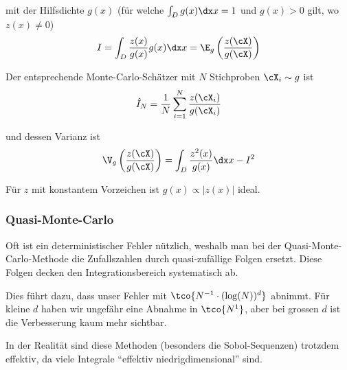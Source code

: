 \drmvspace
mit der Hilfsdichte $g(x)$ (für welche $\int_D g(x) \dx x = 1$ und $g(x) > 0$ gilt, wo $z(x) \neq 0$)
\rmvspace
\begin{align*}
    I = \int_D \frac{z(x)}{g(x)} g(x) \dx x = \E_g \left( \frac{z(\cX)}{g(\cX)} \right)
\end{align*}

\drmvspace
Der entsprechende Monte-Carlo-Schätzer mit $N$ Stichproben $\cX_i \sim g$ ist
\rmvspace
\begin{align*}
    \hat{I}_N = \frac{1}{N} \sum_{i = 1}^{N} \frac{z(\cX_i)}{g(\cX_i)}
\end{align*}

\drmvspace
und dessen Varianz ist
\rmvspace
\begin{align*}
    \V_g\left( \frac{z(\cX)}{g(\cX)} \right) = \int_{D} \frac{z^2(x)}{g(x)} \dx x - I^2
\end{align*}

\drmvspace
Für $z$ mit konstantem Vorzeichen ist $g(x) \propto |z(x)|$ ideal.



\subsubsection{Quasi-Monte-Carlo}
Oft ist ein deterministischer Fehler nützlich, weshalb man bei der Quasi-Monte-Carlo-Methode die Zufallszahlen durch quasi-zufällige Folgen ersetzt.
Diese Folgen decken den Integrationsbereich systematisch ab.

Dies führt dazu, dass unser Fehler mit $\tco{N^{-1} \cdot (\log(N))^d}$ abnimmt.
Für kleine $d$ haben wir ungefähr eine Abnahme in $\tco{N^1}$, aber bei grossen $d$ ist die Verbesserung kaum mehr sichtbar.

In der Realität sind diese Methoden (besonders die Sobol-Sequenzen) trotzdem effektiv, da viele Integrale ``effektiv niedrigdimensional'' sind.
